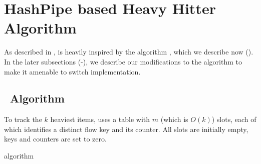 \newcommand{\baselineAlgorithm}{%
\begin{algorithm}
\SetAlgoLined
$i = 0$\;
\lnl{loop} \While{i $<$ d}{
$l = h_i(ikey)$\;
\uIf{$key_l = ikey$}{$val_l$++; end\;}
\uElseIf{$val_l = 0$}{l = (ikey, 1); end\;}
\Else{$min = update(min)$\;}
$i$++\;
}
\uIf{$i = d$}{$min = (ikey, val_{min} + 1)$\;}
\end{algorithm}}

\newcommand{\OurAlgorithm}{%
\begin{algorithm}
\SetAlgoLined
$i = 0, cKey = iKey, cVal = 1$\;
\lnl{loop} \While{i $<$ d}{
$l = h_i(cKey)$\;
\uIf{$key_l = ckey$}{$val_l$ += $cVal$; end\;}
\uElseIf{$val_l = 0$}{l = (ckey, cVal); end\;}
\uElseIf{$val_l < cVal$}{swap $(key_l, val_l)$ with $(cKey, cVal)$\;}
$i$++\;
}
\end{algorithm}}

\section{HashPipe based Heavy Hitter Algorithm}\label{sec:algorithm} 

As described in , \TheSystem is heavily inspired by the \spacesaving algorithm \cite{metwally2005efficient}, which we describe now
(). In the later subsections
(-), we describe our modifications to
the algorithm to make it amenable to switch implementation.
%

\subsection{\spacesaving\ Algorithm}
\label{sec:spacesaving}

To track the $k$ heaviest items, \spacesaving uses a table with $m$ (which is
$O(k)$) slots, each of which identifies a distinct flow key and its counter. All
slots are initially empty, \ie keys and counters are set to zero.

\begin{algorithm}
\DontPrintSemicolon %
\;

\caption{\spacesaving algorithm~\cite{metwally2005efficient}}
\label{algo:spacesaving}
\end{algorithm}

